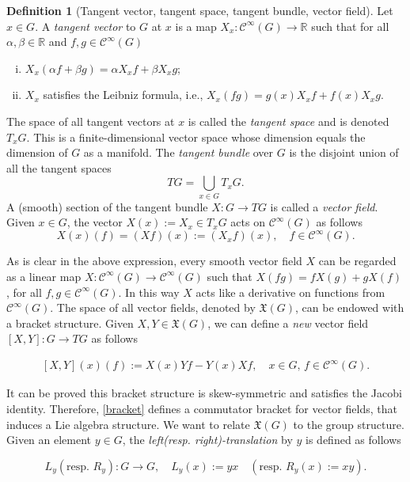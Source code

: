 \documentclass[12pt,oneside,a4paper]{book}
\numberwithin{equation}{section}     %
\theoremstyle{plain}
\theoremstyle{definition}
\newtheorem{definition}[theorem]{Definition}
\newcommand{\R}{{\mathbb R}}
\begin{document}
\begin{definition}[Tangent vector, tangent space, tangent bundle, vector field]
	Let $x\in G$. A \textit{tangent vector} to $G$ at $x$ is a map $X_{x}:\mathcal C^{\infty}(G)\rightarrow \R$ such that for all $\alpha,\beta\in\R$ and $f,g \in \mathcal C^{\infty}(G)$ 
	\begin{enumerate}[i.]
		\item $X_{x}(\alpha f+\beta g)=\alpha X_{x}f+\beta X_{x}g$;
		\item $X_{x}$ satisfies the Leibniz formula, i.e., $X_{x}(fg)=g(x)X_{x}f+f(x)X_{x}g$.
	\end{enumerate}
	
	The space of all tangent vectors at $x$ is called the \textit{tangent space} and is denoted $T_xG$. This is a finite-dimensional vector space whose dimension equals the dimension of $G$ as a manifold. The \textit{tangent bundle} over $G$ is the disjoint union of all the tangent spaces
	\[
	TG=\bigcup_{x\in G}T_x G.
	\]
	A (smooth) section of the tangent bundle $X: G\rightarrow TG$ is called a \textit{vector field}. Given $x\in G$, the vector $X(x):=X_x\in T_x G$ acts on $\mathcal C^{\infty}(G)$ as follows
	\[
	X(x)(f)=(Xf)(x):=(X_x f)(x),\quad f\in\mathcal{C}^\infty(G). 
	\]
\end{definition}
As is clear in the above expression, every smooth vector field $X$ can be regarded as a linear map $X:\mathcal{C}^\infty (G)\rightarrow \mathcal{C}^\infty(G)$ such that $X(fg)=fX(g)+gX(f)$, for all $f,g\in\mathcal{C}^\infty(G)$. In this way $X$ acts like a derivative on functions from $\mathcal{C}^\infty(G)$. The space of all vector fields, denoted by $\mathfrak{X}(G)$, can be endowed with a bracket structure. Given $X,Y\in\mathfrak{X}(G)$, we can define a \textit{new} vector field $[X,Y]:G\rightarrow TG$ as follows

\begin{align}\label{bracket}
[X,Y](x)(f):=X(x)Yf-Y(x)Xf,\quad x\in G,\, f\in\mathcal{C}^\infty(G).
\end{align}

It can be proved this bracket structure is skew-symmetric and satisfies the Jacobi identity. Therefore, \eqref{bracket} defines a commutator bracket for vector fields, that induces a Lie algebra structure. We want to relate $\mathfrak{X}(G)$ to the group structure. Given an element $y\in G$, the \textit{left(resp. right)-translation} by $y$ is defined as follows

\[
L_y(\text{resp. }R_y):G\rightarrow G, \quad L_y(x):=yx\quad (\text{resp. }R_y(x):=xy).
\]
\end{document}
